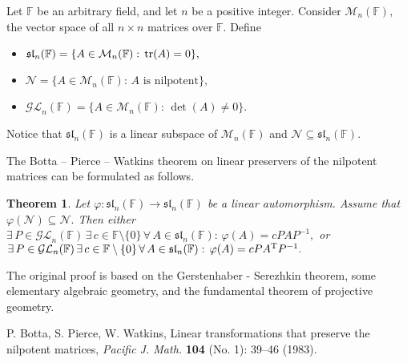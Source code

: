 \documentclass[12pt]{article}
\newtheorem{thm}{Theorem}
\begin{document}
Let $\mathbb{F}$ be an arbitrary field, and let $n$ be a positive integer. Consider $\mathcal{M}_n (\mathbb{F}),$ the vector space of all $n \times n$ matrices over $\mathbb{F}.$ Define
\begin{itemize}
\item
$\mathfrak{sl}_n (\mathbb{F}) = \{A \in \mathcal{M}_n (\mathbb{F}):\, {\rm tr} (A) = 0\},$
\item
$\mathcal{N} = \{A \in \mathcal{M}_n (\mathbb{F}):\, A\, \, \mbox{is nilpotent}\},$
\item
$\mathcal{GL}_n (\mathbb{F}) = \{A \in \mathcal{M}_n (\mathbb{F}):\, \det (A) \neq 0\}.$
\end{itemize}

Notice that $\mathfrak{sl}_n (\mathbb{F})$ is a linear subspace of $\mathcal{M}_n (\mathbb{F})$ and $\mathcal{N} \subseteq \mathfrak{sl}_n (\mathbb{F}).$

The Botta -- Pierce -- Watkins theorem on linear preservers of the nilpotent matrices \cite{BPW} can be formulated as follows.
\begin{thm}
Let $\varphi : \mathfrak{sl}_n (\mathbb{F}) \longrightarrow \mathfrak{sl}_n (\mathbb{F})$ be a linear automorphism. Assume that $\varphi (\mathcal{N}) \subseteq \mathcal{N}.$ Then either $\exists\, P \in \mathcal{GL}_n (\mathbb{F})\, \exists\, c \in \mathbb{F} \setminus \{0\}\, \forall\, A \in \mathfrak{sl}_n (\mathbb{F}) :\, \varphi (A) = c P A P^{-1},$ or $\exists\, P \in \mathcal{GL}_n (\mathbb{F})\, \exists\, c \in \mathbb{F} \setminus \{0\}\, \forall\, A \in \mathfrak{sl}_n (\mathbb{F}) :\, \varphi (A) = c P A^{\rm T} P^{-1}.$
\end{thm}

The original proof is based on the Gerstenhaber - Serezhkin theorem, some elementary algebraic geometry, and the fundamental theorem of projective geometry.
\begin{thebibliography}{99}
P. Botta, S. Pierce, W. Watkins, Linear transformations that preserve the nilpotent matrices, \emph{Pacific J. Math.} {\bf 104} (No. 1): 39--46 (1983).
\end{thebibliography}
\end{document}
